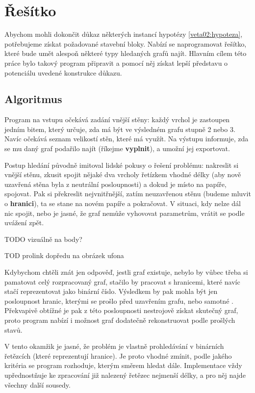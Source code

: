 
\chapter{Řešítko} \label{resitko}
Abychom mohli dokončit důkaz některých instancí hypotézy \ref{veta02:hypoteza}, potřebujeme získat požadované stavební bloky. Nabízí se naprogramovat řešítko, které bude umět alespoň některé typy hledaných grafů najít. Hlavním cílem této práce bylo takový program připravit a pomocí něj získat lepší představu o potenciálu uvedené konstrukce důkazu.

\section{Algoritmus}

Program na vstupu očekává zadání vnější stěny: každý vrchol je zastoupen jedním bitem, který určuje, zda má být ve výsledném grafu stupně 2 nebo 3. Navíc očekává seznam velikostí stěn, které má využít. Na výstupu informuje, zda se mu daný graf podařilo najít (říkejme \textbf{vyplnit}), a umožní jej exportovat.

Postup hledání původně imitoval lidské pokusy o řešení problému: nakreslit si vnější stěnu, zkusit spojit nějaké dva vrcholy řetízkem vhodné délky (aby nově uzavřená stěna byla z neutrální posloupnosti) a dokud je místo na papíře, spojovat. Pak si překreslit nejvnitřnější, zatím neuzavřenou stěnu (budeme mluvit o \textbf{hranici}), ta se stane  na novém papíře a pokračovat. V situaci, kdy nelze dál nic spojit, nebo je jasné, že graf nemůže vyhovovat parametrům, vrátit se podle uvážení zpět.

TODO vizuálně na body?

TOD prolink dopředu na obrázek ufona

Kdybychom chtěli znát jen  odpověď, jestli graf existuje, nebylo by vůbec třeba si pamatovat celý rozpracovaný graf, stačilo by pracovat s hranicemi, které navíc stačí reprezentovat jako binární číslo. Výsledkem by pak mohla být jen posloupnost hranic, kterými se prošlo před uzavřením grafu, nebo samotné . Překvapivě obtížné je pak z této posloupnosti nestrojově získat skutečný graf, proto program nabízí i možnost graf dodatečně rekonstruovat podle prošlých stavů.

V tento okamžik je jasné, že problém je vlastně prohledávání v binárních řetězcích (které reprezentují hranice). Je proto vhodné zmínit, podle jakého kritéria se program rozhoduje, kterým směrem hledat dále. Implementace vždy upřednostňuje ke zpracování již nalezený řetězec nejmenší délky, a pro něj najde všechny další sousedy.

